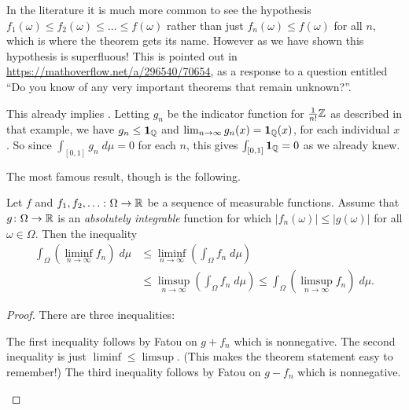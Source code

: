\begin{remark}
	In the literature it is much more common
	to see the hypothesis $f_1(\omega) \le f_2(\omega) \le \dots \le f(\omega)$
	rather than just $f_n(\omega) \le f(\omega)$ for all $n$,
	which is where the theorem gets its name.
	However as we have shown this hypothesis is superfluous!
	This is pointed out in \url{https://mathoverflow.net/a/296540/70654},
	as a response to a question entitled
	``Do you know of any very important theorems that remain unknown?''.
\end{remark}

\begin{example}
	This already implies .
	Letting $g_n$ be the indicator function for $\frac1{n!}\mathbb Z$
	as described in that example, we have $g_n \le \mathbf{1}_\mathbb Q$
	and $\lim_{n \to \infty} g_n(x) = \mathbf{1}_\mathbb Q(x)$,
	for each individual $x$.
	So since $\int_{[0,1]} g_n \; d\mu = 0$ for each $n$,
	this gives $\int_{[0,1]} \mathbf{1}_\mathbb Q = 0$ as we already knew.
\end{example}

The most famous result, though is the following.
\begin{corollary}
	Let $f$ and $f_1, f_2, \dots \colon \Omega \to \mathbb R$
	be a sequence of measurable functions.
	Assume that $g \colon \Omega \to \mathbb R$ is an
	\emph{absolutely integrable} function for which
	$|f_n(\omega)| \le |g(\omega)|$ for all $\omega \in \Omega$.
	Then the inequality
	\begin{align*}
		\int_\Omega \left( \liminf_{n \to \infty} f_n \right) \; d\mu
		&\le \liminf_{n \to \infty} \left( \int_\Omega f_n \; d\mu \right) \\
		&\le \limsup_{n \to \infty} \left( \int_\Omega f_n \; d\mu \right)
		\le \int_\Omega \left( \limsup_{n \to \infty} f_n \right) \; d\mu.
	\end{align*}
\end{corollary}
\begin{proof}
	There are three inequalities:
	\begin{itemize}
		\ii The first inequality follows by Fatou on $g + f_n$ which is nonnegative.
		\ii The second inequality is just $\liminf \le \limsup$.
		(This makes the theorem statement easy to remember!)
		\ii The third inequality follows by Fatou on $g - f_n$ which is nonnegative.
		\qedhere
	\end{itemize}
\end{proof}

